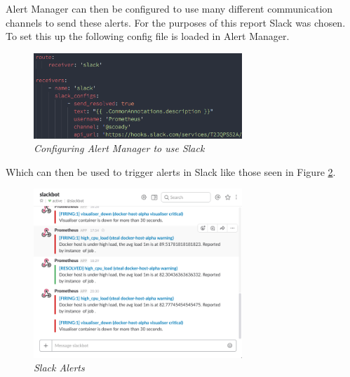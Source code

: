 Alert Manager can then be configured to use many different communication channels to send these alerts. For the purposes of this report Slack was chosen. To set this up the following config file is loaded in Alert Manager.

\begin{figure}[!h]
	\centering
	\includegraphics*[width=0.7\textwidth]{components/images/slack-config}
	\caption{\em Configuring Alert Manager to use Slack}
	\label{fig:slack-config}
\end{figure}

Which can then be used to trigger alerts in Slack like those seen in Figure \ref{fig:slack}.

\begin{figure}[!h]
	\centering
	\includegraphics*[width=0.7\textwidth]{components/images/slack}
	\caption{\em Slack Alerts}
	\label{fig:slack}
\end{figure}
